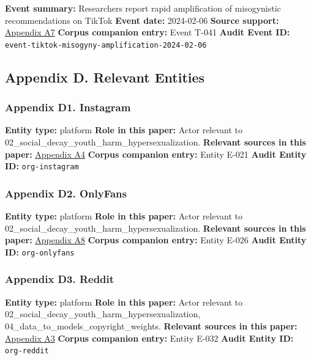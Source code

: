 \documentclass[
  american,
  11pt,
  letterpaper,
]{article}
\begin{document}
\textbf{Event summary:} Researchers report rapid amplification of
misogynistic recommendations on TikTok \textbf{Event date:} 2024-02-06
\textbf{Source support:}
\hyperref[appendix-a7-social-media-algorithms-amplifying-misogynistic-content]{Appendix
A7} \textbf{Corpus companion entry:} Event T-041 \textbf{Audit Event
ID:} \texttt{event-tiktok-misogyny-amplification-2024-02-06}

\subsection{Appendix D. Relevant
Entities}\label{appendix-d.-relevant-entities}

\subsubsection{Appendix D1. Instagram}\label{appendix-d1-instagram}

\textbf{Entity type:} platform \textbf{Role in this paper:} Actor
relevant to 02\_social\_decay\_youth\_harm\_hypersexualization.
\textbf{Relevant sources in this paper:}
\hyperref[appendix-a4-unfiltered-how-teens-engage-in-body-image-and-shaming-discussions-via-instagram-direct-messages-dms]{Appendix
A4} \textbf{Corpus companion entry:} Entity E-021 \textbf{Audit Entity
ID:} \texttt{org-instagram}

\subsubsection{Appendix D2. OnlyFans}\label{appendix-d2-onlyfans}

\textbf{Entity type:} platform \textbf{Role in this paper:} Actor
relevant to 02\_social\_decay\_youth\_harm\_hypersexualization.
\textbf{Relevant sources in this paper:}
\hyperref[appendix-a8-nudes-shouldn-t-i-charge-for-these-motivations-of-new-sexual-content-creators-on-onlyfans]{Appendix
A8} \textbf{Corpus companion entry:} Entity E-026 \textbf{Audit Entity
ID:} \texttt{org-onlyfans}

\subsubsection{Appendix D3. Reddit}\label{appendix-d3-reddit}

\textbf{Entity type:} platform \textbf{Role in this paper:} Actor
relevant to 02\_social\_decay\_youth\_harm\_hypersexualization,
04\_data\_to\_models\_copyright\_weights. \textbf{Relevant sources in
this paper:}
\hyperref[appendix-a3-quantifying-social-organization-and-political-polarization-in-online-platforms]{Appendix
A3} \textbf{Corpus companion entry:} Entity E-032 \textbf{Audit Entity
ID:} \texttt{org-reddit}
\end{document}
